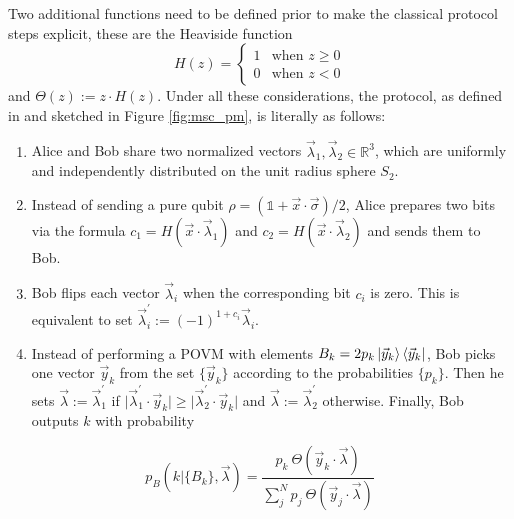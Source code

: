 Two additional functions need to be defined prior to make the classical protocol steps explicit, these are the Heaviside function
\begin{equation}
H(z) =
    \begin{cases}
      1 & \text{when $z \ge 0$}\\
      0 & \text{when $z<0$}
    \end{cases} 
\end{equation}
and $\Theta(z) := z \cdot H(z)$. Under all these considerations, the protocol, as defined in \cite{renner2022} and sketched in Figure \ref{fig:msc_pm}, is literally as follows:
\begin{enumerate}
 \item Alice and Bob share two normalized vectors $\vec{\lambda}_1, \vec{\lambda}_2 \in \mathbb{R}^{3}$, which are uniformly and independently distributed on the unit radius sphere $S_2$.
 \item Instead of sending a pure qubit $\rho = (\mathbb{1} + \vec{x} \cdot \vec{\sigma})/2$, Alice prepares two bits via the formula $c_1= H(\vec{x} \cdot \vec{\lambda}_1)$ and $c_2= H(\vec{x} \cdot \vec{\lambda}_2)$ and sends them to Bob.
 \item Bob flips each vector $\vec{\lambda}_i$ when the corresponding bit $c_i$ is zero. This is equivalent to set $\vec{\lambda}^{\prime}_{i} := (-1)^{1 + c_i} \vec{\lambda}_{i}$.
 \item Instead of performing a POVM with elements $B_{k} = 2p_{k}\ket{\vec{y}_{k}}\bra{\vec{y}_{k}}$, Bob picks one vector $\vec{y}_{k}$ from the set $\{\vec{y}_{k}\}$ according to the probabilities $\{p_{k}\}$. Then he sets $\vec{\lambda} := \vec{\lambda}^{\prime}_1$ if $\lvert \vec{\lambda}^{\prime}_1 \cdot \vec{y}_{k} \rvert \ge \lvert \vec{\lambda}^{\prime}_2 \cdot \vec{y}_{k} \rvert$ and $\vec{\lambda} := \vec{\lambda}^{\prime}_2$ otherwise. Finally, Bob outputs $k$ with probability
\end{enumerate}

\begin{equation}\label{eq:prob_classic_bob}
p_B(k|\{B_{k}\},\vec{\lambda}) = \frac{p_{k}\ \Theta(\vec{y}_{k} \cdot \vec{\lambda})}{\sum_{j}^{N}p_j\ \Theta(\vec{y}_j \cdot \vec{\lambda})}
\end{equation}

